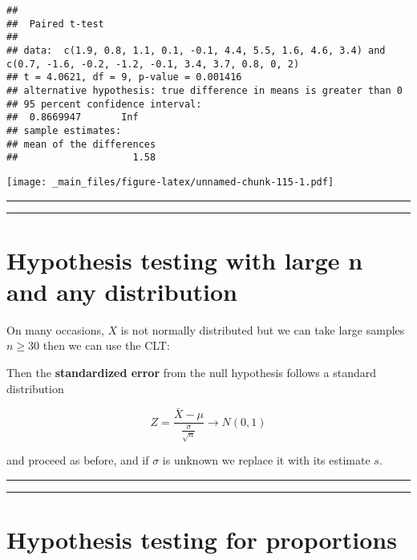 \documentclass[
]{book}
\begin{document}
\begin{verbatim}
## 
##  Paired t-test
## 
## data:  c(1.9, 0.8, 1.1, 0.1, -0.1, 4.4, 5.5, 1.6, 4.6, 3.4) and c(0.7, -1.6, -0.2, -1.2, -0.1, 3.4, 3.7, 0.8, 0, 2)
## t = 4.0621, df = 9, p-value = 0.001416
## alternative hypothesis: true difference in means is greater than 0
## 95 percent confidence interval:
##  0.8669947       Inf
## sample estimates:
## mean of the differences 
##                    1.58
\end{verbatim}

\texttt{[image: \_main\_files/figure-latex/unnamed-chunk-115-1.pdf]}

\begin{center}\rule{0.5\linewidth}{0.5pt}\end{center}

\begin{center}\rule{0.5\linewidth}{0.5pt}\end{center}

\hypertarget{hypothesis-testing-with-large-n-and-any-distribution}{%
\section{Hypothesis testing with large n and any distribution}\label{hypothesis-testing-with-large-n-and-any-distribution}}

On many occasions, \(X\) is not normally distributed but we can take large samples \(n \ge 30\) then we can use the CLT:

Then the \textbf{standardized error} from the null hypothesis follows a standard distribution

\[Z=\frac{\bar{X}-\mu}{\frac{\sigma}{\sqrt{n}}}  \rightarrow N(0,1)\]

and proceed as before, and if \(\sigma\) is unknown we replace it with its estimate \(s\).

\begin{center}\rule{0.5\linewidth}{0.5pt}\end{center}

\begin{center}\rule{0.5\linewidth}{0.5pt}\end{center}

\hypertarget{hypothesis-testing-for-proportions}{%
\section{Hypothesis testing for proportions}\label{hypothesis-testing-for-proportions}}
\end{document}
